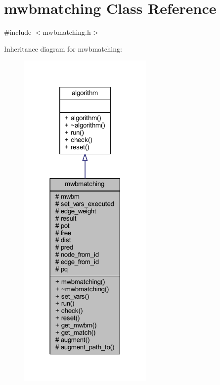 \hypertarget{classmwbmatching}{}\section{mwbmatching Class Reference}
\label{classmwbmatching}


{\ttfamily \#include $<$mwbmatching.\+h$>$}



Inheritance diagram for mwbmatching\+:\nopagebreak
\begin{figure}[H]
\begin{center}
\leavevmode
\includegraphics[width=186pt]{classmwbmatching__inherit__graph}
\end{center}
\end{figure}


